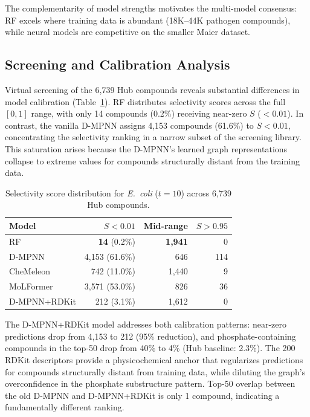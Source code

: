 \documentclass{article}
\begin{document}
The complementarity of model strengths motivates the multi-model consensus: RF excels where training data is abundant (18K--44K pathogen compounds), while neural models are competitive on the smaller Maier dataset.

\subsection{Screening and Calibration Analysis}
\label{sec:screening}

Virtual screening of the 6,739 Hub compounds reveals substantial differences in model calibration (Table~\ref{tab:calibration}).
RF distributes selectivity scores across the full $[0,1]$ range, with only 14 compounds (0.2\%) receiving near-zero $S$ ($< 0.01$).
In contrast, the vanilla D-MPNN assigns 4,153 compounds (61.6\%) to $S < 0.01$, concentrating the selectivity ranking in a narrow subset of the screening library.
This saturation arises because the D-MPNN's learned graph representations collapse to extreme values for compounds structurally distant from the training data.

\begin{table}[t]
\caption{Selectivity score distribution for \textit{E.~coli} ($t{=}10$) across 6,739 Hub compounds.}
\label{tab:calibration}
\vskip 0.1in
\centering
\scriptsize
\begin{tabular}{lrrr}
\toprule
\textbf{Model} & $S{<}0.01$ & \textbf{Mid-range} & $S{>}0.95$ \\
\midrule
RF              & \textbf{14} (0.2\%) & \textbf{1,941} & 0 \\
D-MPNN          & 4,153 (61.6\%) & 646 & 114 \\
CheMeleon       & 742 (11.0\%) & 1,440 & 9 \\
MoLFormer       & 3,571 (53.0\%) & 826 & 36 \\
D-MPNN+RDKit    & 212 (3.1\%) & 1,612 & 0 \\
\bottomrule
\end{tabular}
\end{table}

The D-MPNN+RDKit model addresses both calibration patterns: near-zero predictions drop from 4,153 to 212 (95\% reduction), and phosphate-containing compounds in the top-50 drop from 40\% to 4\% (Hub baseline: 2.3\%).
The 200 RDKit descriptors provide a physicochemical anchor that regularizes predictions for compounds structurally distant from training data, while diluting the graph's overconfidence in the phosphate substructure pattern.
Top-50 overlap between the old D-MPNN and D-MPNN+RDKit is only 1 compound, indicating a fundamentally different ranking.
\end{document}
